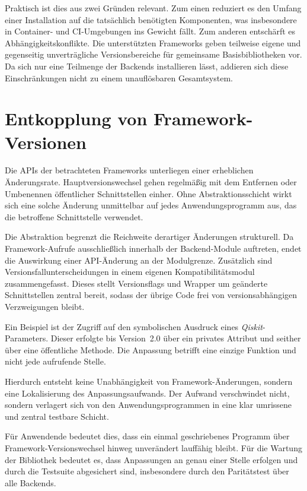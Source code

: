 Praktisch ist dies aus zwei Gründen relevant. Zum einen reduziert es den Umfang
einer Installation auf die tatsächlich benötigten Komponenten, was insbesondere
in Container- und CI-Umgebungen ins Gewicht fällt. Zum anderen entschärft es
Abhängigkeitskonflikte. Die unterstützten Frameworks geben teilweise eigene und
gegenseitig unverträgliche Versionsbereiche für gemeinsame Basisbibliotheken vor.
Da sich nur eine Teilmenge der Backends installieren lässt, addieren sich diese
Einschränkungen nicht zu einem unauflösbaren Gesamtsystem.

\newpage
\section{Entkopplung von Framework-Versionen}
\label{sec:vorteile_versionen}

Die APIs der betrachteten Frameworks unterliegen einer erheblichen Änderungsrate.
Hauptversionswechsel gehen regelmäßig mit dem Entfernen oder Umbenennen
öffentlicher Schnittstellen einher. Ohne Abstraktionsschicht wirkt sich eine
solche Änderung unmittelbar auf jedes Anwendungsprogramm aus, das die betroffene
Schnittstelle verwendet.

Die Abstraktion begrenzt die Reichweite derartiger Änderungen strukturell. Da
Framework-Aufrufe ausschließlich innerhalb der Backend-Module auftreten, endet
die Auswirkung einer API-Änderung an der Modulgrenze. Zusätzlich sind
Versionsfallunterscheidungen in einem eigenen Kompatibilitätsmodul
zusammengefasst. Dieses stellt Versionsflags und Wrapper um geänderte
Schnittstellen zentral bereit, sodass der übrige Code frei von
versionsabhängigen Verzweigungen bleibt.

Ein Beispiel ist der Zugriff auf den
symbolischen Ausdruck eines \textit{Qiskit}-Parameters. Dieser erfolgte bis Version~2.0
über ein privates Attribut und seither über eine öffentliche Methode. Die
Anpassung betrifft eine einzige Funktion und nicht jede aufrufende Stelle.

Hierdurch entsteht keine Unabhängigkeit von Framework-Änderungen, sondern eine
Lokalisierung des Anpassungsaufwands. Der Aufwand verschwindet nicht, sondern
verlagert sich von den Anwendungsprogrammen in eine klar umrissene und zentral
testbare Schicht.

Für Anwendende bedeutet dies, dass ein einmal geschriebenes
Programm über Framework-Versionswechsel hinweg unverändert lauffähig bleibt. Für
die Wartung der Bibliothek bedeutet es, dass Anpassungen an genau einer Stelle
erfolgen und durch die Testsuite abgesichert sind, insbesondere durch den
Paritätstest über alle Backends.


